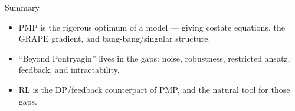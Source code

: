 \documentclass[10pt,aspectratio=169]{beamer}
\begin{document}
\begin{frame}[standout]{Summary}
  \begin{itemize}
    \item PMP is the rigorous optimum \alert{of a model} --- giving costate
          equations, the GRAPE gradient, and bang-bang/singular structure.
    \item ``Beyond Pontryagin'' lives in the gaps: noise, robustness, restricted
          ansatz, feedback, and intractability.
    \item RL is the DP/feedback counterpart of PMP, and the natural tool for
          those gaps.
  \end{itemize}
\end{frame}
\end{document}
